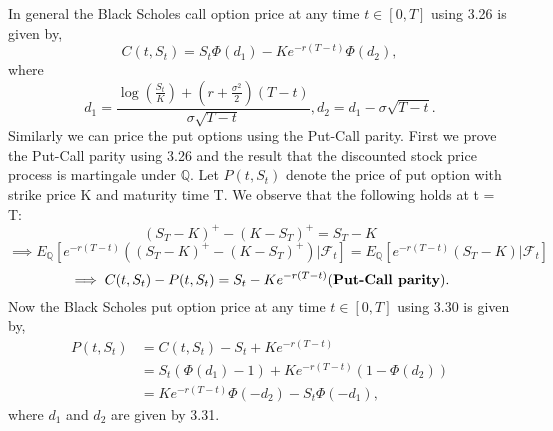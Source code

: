 \documentclass[12pt]{report}
\begin{document}
In general the Black Scholes call option price at any time $t \in [0,T]$ using 3.26 is given by,\\
\begin{equation}
    C(t,S_t) = S_t \Phi(d_1) - K e^{-r(T-t)} \Phi(d_2),
\end{equation}
where
\begin{equation}
    d_1 = \frac{\log(\frac{S_{t}}{K}) + (r+\frac{\sigma^{2}}{2})(T-t)}{\sigma \sqrt{T-t}}, d_2 = d_1 - \sigma \sqrt{T-t}.
\end{equation}
Similarly we can price the put options using the Put-Call parity. First we prove the Put-Call parity using 3.26 and the result that the discounted stock price process is martingale under $\mathbb{Q}$. Let $P(t,S_t)$ denote the price of put option with strike price K and maturity time T. We observe that the following holds at t = T:\\
$$ (S_{T}-K)^{+} - (K-S_{T})^{+} = S_{T} - K $$
$$\implies E_{\mathbb{Q}}[e^{-r(T-t)}\left((S_{T}-K)^{+} - (K-S_{T})^{+}\right)|\mathcal{F}_{t}] = E_{\mathbb{Q}}[e^{-r(T-t)}\left(S_{T}-K\right)|\mathcal{F}_{t}] $$
$$ \implies C(t,S_t) - P(t,S_t) = S_t - K e^{-r(T-t)} \mbox{(\textbf{Put-Call parity}).} $$
Now the Black Scholes put option price at any time $t \in [0,T]$ using 3.30 is given by,
\begin{align*}
    P(t,S_t) &= C(t,S_t) - S_t + K e^{-r(T-t)}\\
    & = S_t(\Phi(d_1) - 1) + K e^{-r(T-t)} (1 - \Phi(d_2))\\
    & = K e^{-r(T-t)} \Phi(-d_2) -  S_t \Phi(-d_1),
\end{align*}
where $d_1$ and $d_2$ are given by 3.31.




\end{document}

